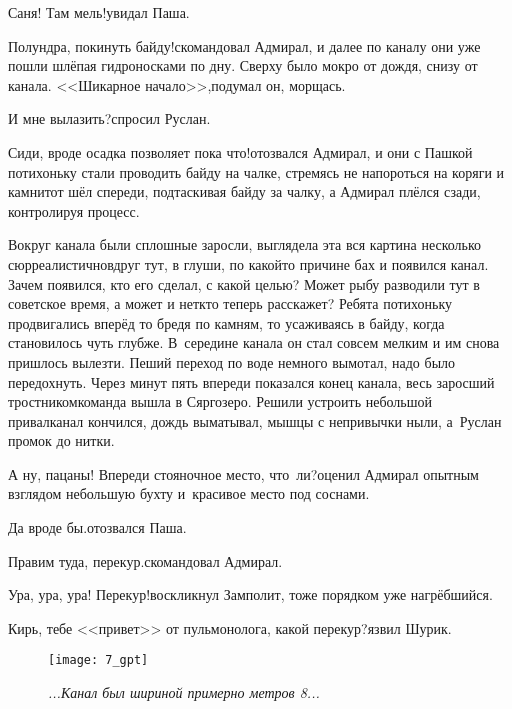 \diagdash Саня! Там мель!\mdash увидал Паша. 

\diagdash Полундра, покинуть байду!\mdash скомандовал Адмирал, и далее по каналу они уже пошли шлёпая гидроносками по дну. Сверху было мокро от дождя, снизу от канала. <<Шикарное начало>>,\mdash подумал он, морщась.

\diagdash И мне вылазить?\mdash спросил Руслан. 


\diagdash Сиди, вроде осадка позволяет пока что!\mdash отозвался Адмирал, и они с Пашкой потихоньку стали проводить байду на чалке, стремясь не напороться на коряги и камни\mdash тот шёл спереди, подтаскивая байду за чалку, а Адмирал плёлся сзади, контролируя процесс.

Вокруг канала были сплошные заросли, выглядела эта вся картина несколько сюрреалистично\mdash вдруг тут, в глуши, по какой\sdash то причине бах и появился канал. Зачем появился, кто его сделал, с какой целью? Может рыбу разводили тут в советское время, а может и нет\mdash кто теперь расскажет? Ребята потихоньку продвигались вперёд то бредя по камням, то усаживаясь в байду, когда становилось чуть глубже. В~середине канала он стал совсем мелким и им снова пришлось вылезти. Пеший переход по воде немного вымотал, надо было передохнуть. Через минут пять впереди показался конец канала, весь заросший тростником\mdash команда вышла в Сяргозеро. Решили устроить небольшой привал\mdash канал кончился, дождь выматывал, мышцы с непривычки ныли, а~Руслан промок до нитки.

\diagdash А ну, пацаны! Впереди стояночное место, что~ли?\mdash оценил Адмирал опытным взглядом небольшую бухту и~красивое место под соснами.

\diagdash Да вроде бы.\mdash отозвался Паша.

\diagdash Правим туда, перекур.\mdash скомандовал Адмирал. 

\diagdash Ура, ура, ура! Перекур!\mdash воскликнул Замполит, тоже порядком уже нагрёбшийся.

\diagdash Кирь, тебе <<привет>> от пульмонолога, какой перекур?\mdash язвил Шурик.

\begin{figure}[h]
	\centering
	\texttt{[image: 7\_gpt]}
	\caption{\small\textit{...Канал был шириной примерно метров 8...}}
\end{figure}

